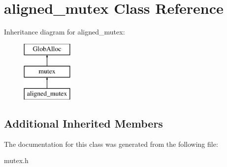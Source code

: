 \hypertarget{classaligned__mutex}{\section{aligned\-\_\-mutex Class Reference}
\label{classaligned__mutex}
}
Inheritance diagram for aligned\-\_\-mutex\-:\begin{figure}[H]
\begin{center}
\leavevmode
\includegraphics[height=3.000000cm]{classaligned__mutex}
\end{center}
\end{figure}
\subsection*{Additional Inherited Members}


The documentation for this class was generated from the following file\-:\begin{DoxyCompactItemize}
\item 
mutex.\-h\end{DoxyCompactItemize}
